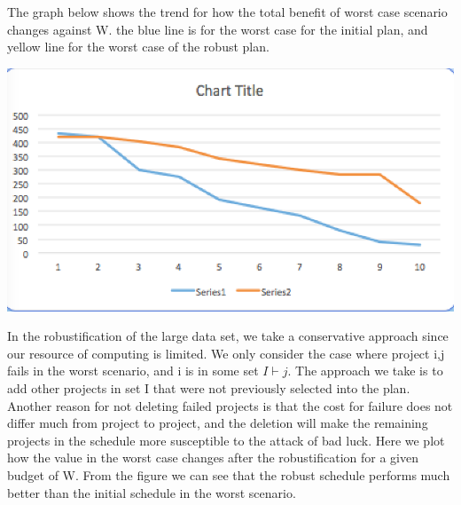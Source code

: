 \documentclass[final,3p,times]{elsarticle}
\begin{document}
The graph below shows the trend for how the total benefit of worst case scenario changes against W. the blue line is for the worst case for the initial plan, and yellow line for the worst case of the robust plan.

\includegraphics {mopta}


In the robustification of the large data set, we take a conservative approach since our resource of computing is limited. We only consider the case where project i,j fails in the worst scenario, and i is in some set $I \vdash j$. The approach we take is to add other projects in set I that were not previously selected into the plan. Another reason for not deleting failed projects is that the cost for failure does not differ much from project to project, and the deletion will make the remaining projects in the schedule more susceptible to the attack of bad luck. Here we plot how the value in the worst case changes after the robustification for a given budget of W. From the figure we can see that the robust schedule performs much better than the initial schedule in the worst scenario.
\end{document}
